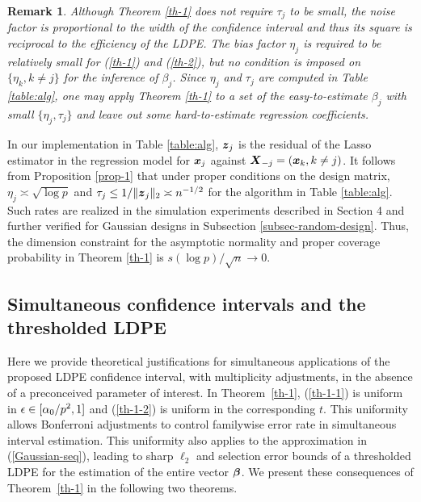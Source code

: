 \documentclass[11pt]{amsart}
\newtheorem{remark}{Remark}
\begin{document}
\begin{remark}Although Theorem \ref{th-1} does not require $\tau_j$ to be small, 
the noise factor is proportional to the width of the confidence interval and thus 
its square is reciprocal to the efficiency of the LDPE. 
The bias factor $\eta_j$ is required to be relatively small for (\ref{th-1}) and (\ref{th-2}), 
but no condition is imposed on $\{\eta_k, k\neq j\}$ for the inference of $\beta_j$. 
Since $\eta_j$ and $\tau_j$ are computed in Table \ref{table:alg}, one may apply 
Theorem \ref{th-1} to a set of the easy-to-estimate $\beta_j$ with small $\{\eta_j,\tau_j\}$ 
and leave out some hard-to-estimate regression coefficients. 
\end{remark}

In our implementation in Table \ref{table:alg}, $\boldsymbol{z}_j$ is the residual of the Lasso estimator 
in the regression model for $\boldsymbol{x}_j$ against $\boldsymbol{X}_{-j}=(\boldsymbol{x}_k,k\neq j)$. 
It follows from Proposition \ref{prop-1} that under proper conditions on the design matrix, 
$\eta_j\asymp \sqrt{\log p}$ and $\tau_j\le 1/\|\boldsymbol{z}_j\|_2 \asymp n^{-1/2}$ for the algorithm in 
Table \ref{table:alg}. Such rates are realized in the simulation experiments described in Section 4 
and further verified for Gaussian designs in Subsection \ref{subsec-random-design}.
Thus, the dimension constraint for the asymptotic normality and proper coverage 
probability in Theorem \ref{th-1} is $s(\log p)/\sqrt{n}\to 0$. 

\subsection{Simultaneous confidence intervals and the thresholded LDPE} 
Here we provide theoretical justifications for simultaneous applications of the proposed LDPE 
confidence interval, with multiplicity adjustments, in the absence of a preconceived parameter of interest. 
In Theorem~\ref{th-1}, (\ref{th-1-1}) is uniform in $\epsilon\in [\alpha_0/p^2,1]$ and 
(\ref{th-1-2}) is uniform in the corresponding $t$. This uniformity 
allows Bonferroni adjustments to control familywise error rate in 
simultaneous interval estimation. This uniformity also applies to the approximation in (\ref{Gaussian-seq}), 
leading to sharp $\ell_2$ and selection error bounds of a thresholded LDPE for the estimation 
of the entire vector $\boldsymbol{\beta}$. 
We present these consequences of Theorem~\ref{th-1} in the following two theorems.
\end{document}
